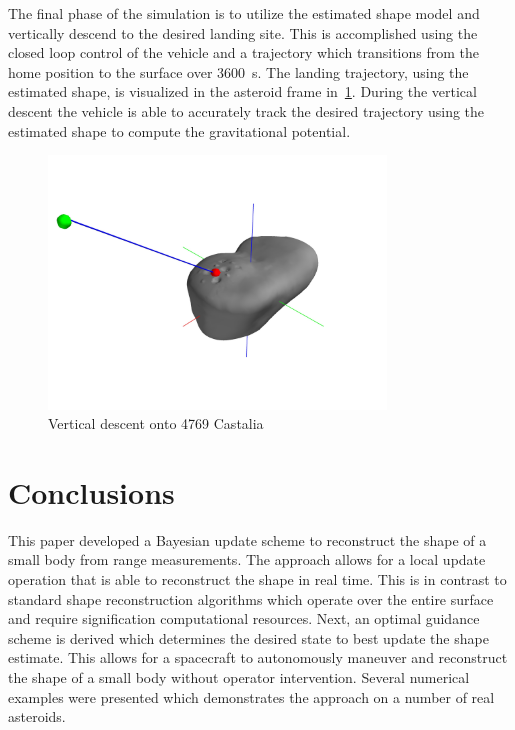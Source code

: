 \documentclass[journal]{new-aiaa}
\begin{document}
The final phase of the simulation is to utilize the estimated shape model and vertically descend to the desired landing site. 
This is accomplished using the closed loop control of the vehicle and a trajectory which transitions from the home position to the surface over \SI{3600}{\second}.
The landing trajectory, using the estimated shape, is visualized in the asteroid frame in~\cref{fig:castalia_landing}.
During the vertical descent the vehicle is able to accurately track the desired trajectory using the estimated shape to compute the gravitational potential.
\begin{figure}[htbp]
    \centering
    \includegraphics[width=0.8\textwidth]{figures/dynamic_exploration/castalia/land/asteroid_trajectory.jpg}
    \caption{Vertical descent onto 4769 Castalia~\label{fig:castalia_landing}}
\end{figure}

\section{Conclusions}

This paper developed a Bayesian update scheme to reconstruct the shape of a small body from range measurements. 
The approach allows for a local update operation that is able to reconstruct the shape in real time. 
This is in contrast to standard shape reconstruction algorithms which operate over the entire surface and require signification computational resources.
Next, an optimal guidance scheme is derived which determines the desired state to best update the shape estimate. 
This allows for a spacecraft to autonomously maneuver and reconstruct the shape of a small body without operator intervention.
Several numerical examples were presented which demonstrates the approach on a number of real asteroids.
\end{document}
